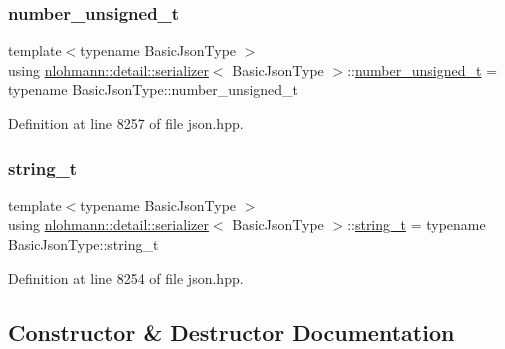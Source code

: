 \subsubsection{\texorpdfstring{number\+\_\+unsigned\+\_\+t}{number\_unsigned\_t}}
{\footnotesize\ttfamily template$<$typename Basic\+Json\+Type $>$ \\
using \hyperlink{classnlohmann_1_1detail_1_1serializer}{nlohmann\+::detail\+::serializer}$<$ Basic\+Json\+Type $>$\+::\hyperlink{classnlohmann_1_1detail_1_1serializer_a16c7b7a726a38ff0c06dce7ba7968391}{number\+\_\+unsigned\+\_\+t} =  typename Basic\+Json\+Type\+::number\+\_\+unsigned\+\_\+t\hspace{0.3cm}{\ttfamily [private]}}



Definition at line 8257 of file json.\+hpp.

\mbox{\label{classnlohmann_1_1detail_1_1serializer_ad08aa54fac1dd0a453320c54137d45ba}} 
\subsubsection{\texorpdfstring{string\+\_\+t}{string\_t}}
{\footnotesize\ttfamily template$<$typename Basic\+Json\+Type $>$ \\
using \hyperlink{classnlohmann_1_1detail_1_1serializer}{nlohmann\+::detail\+::serializer}$<$ Basic\+Json\+Type $>$\+::\hyperlink{classnlohmann_1_1detail_1_1serializer_ad08aa54fac1dd0a453320c54137d45ba}{string\+\_\+t} =  typename Basic\+Json\+Type\+::string\+\_\+t\hspace{0.3cm}{\ttfamily [private]}}



Definition at line 8254 of file json.\+hpp.



\subsection{Constructor \& Destructor Documentation}
\mbox{\label{classnlohmann_1_1detail_1_1serializer_a3076c4514179654cc81d17048439c24a}} 
